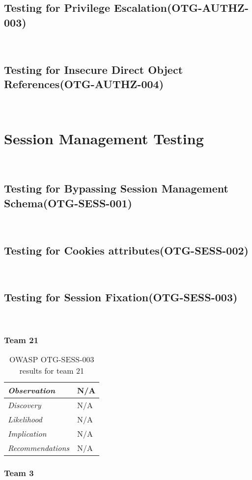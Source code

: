 \documentclass[headsepline,footsepline,footinclude=false,oneside,fontsize=11pt,paper=a4,listof=totoc,bibliography=totoc]{scrbook} %
\begin{document}
\subsection{Testing for Privilege Escalation(OTG-AUTHZ-003)}\
\pagebreak 
\subsection{Testing for Insecure Direct Object References(OTG-AUTHZ-004)}\
 
\pagebreak 
\section{Session Management Testing}\
\subsection{Testing for Bypassing Session Management Schema(OTG-SESS-001)}\
\pagebreak 
\subsection{Testing for Cookies attributes(OTG-SESS-002)}\
\pagebreak 
\subsection{Testing for Session Fixation(OTG-SESS-003)}\

 
 \subsubsection{Team 21}
 
 \begin{table}[H]
 	\centering
 	\begin{tabular}{l p{11cm}} 
 		\textit{Observation} &  N/A\\ 
 		\hline
 		\textit{Discovery} &  N/A \\
 		\hline
 		\textit{Likelihood} & N/A\\
 		\hline
 		\textit{Implication} & N/A\\
 		\hline
 		\textit{Recommendations} & N/A\\ 
 	\end{tabular}
 	\caption{OWASP OTG-SESS-003 results for team 21}
 	\label{table:scenario2}
 \end{table}
 
 \subsubsection{Team 3}
 
\end{document}
